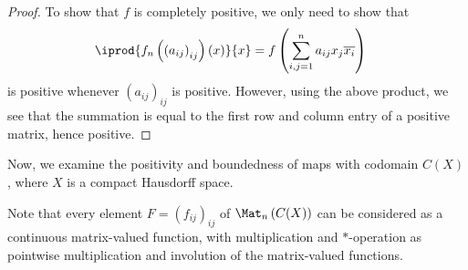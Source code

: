\documentclass[10pt]{mypackage}
\begin{document}
\begin{proof}
  To show that $f$ is completely positive, we only need to show that
  \begin{align*}
    \iprod{f_n\left( \left( a_{ij} \right)_{ij} \right)\left( x \right)}{x} &= f\left( \sum_{i,j=1}^{n}a_{ij}x_j\overline{x_i} \right)
  \end{align*}
  is positive whenever $\left( a_{ij} \right)_{ij}$ is positive. However, using the above product, we see that the summation is equal to the first row and column entry of a positive matrix, hence positive.
\end{proof}
Now, we examine the positivity and boundedness of maps with codomain $C(X)$, where $X$ is a compact Hausdorff space.\newline

Note that every element $F = \left( f_{ij} \right)_{ij}$ of $\Mat_n\left( C(X) \right)$ can be considered as a continuous matrix-valued function, with multiplication and $\ast$-operation as pointwise multiplication and involution of the matrix-valued functions.\newline
\end{document}

